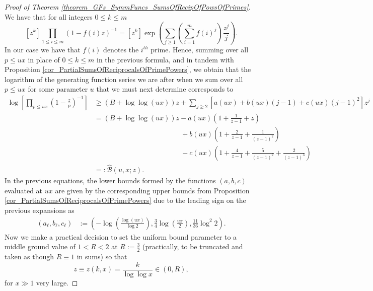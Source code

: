 \documentclass[11pt,reqno,a4letter]{article}
\numberwithin{figure}{section}
\numberwithin{table}{section}
\theoremstyle{plain}
\numberwithin{theorem}{section}
\theoremstyle{definition}
\newcommand{\NBRef}[1]{}
\begin{document}
\NBRef{A06-2020-04-26} 
\begin{proof}[Proof of Theorem \ref{theorem_GFs_SymmFuncs_SumsOfRecipOfPowsOfPrimes}] 
\label{proofOf_theorem_GFs_SymmFuncs_SumsOfRecipOfPowsOfPrimes} 
We have that for all integers $0 \leq k \leq m$
\begin{equation} 
\label{eqn_pf_tag_hSymmPolysGF} 
[z^k] \prod_{1 \leq i \leq m} (1-f(i) z)^{-1} = [z^k] \exp\left(\sum_{j \geq 1} 
     \left(\sum_{i=1}^m f(i)^j\right) \frac{z^j}{j}\right). 
\end{equation} 
In our case we have that $f(i)$ denotes the $i^{th}$ prime. 
Hence, summing over all $p \leq ux$ 
in place of $0 \leq k \leq m$ in the previous formula, and in tandem with 
Proposition \ref{cor_PartialSumsOfReciprocalsOfPrimePowers}, we obtain that the logarithm of the 
generating function series we are after when we sum over all $p \leq ux$ for some parameter 
$u$ that we must next determine corresponds to 
\begin{align*} 
\log\left[\prod_{p \leq ux} \left(1-\frac{z}{p}\right)^{-1}\right] & \geq (B + \log\log (ux)) z + 
     \sum_{j \geq 2} \left[a(ux) + b(ux)(j-1) + c(ux) (j-1)^2\right] z^j \\ 
     & = (B + \log\log (ux)) z - a(ux) \left(1 + \frac{1}{z-1} + z\right) \\ 
     & \phantom{= (B + \log\log (ux)) z\ } + 
     b(ux) \left( 
     1 + \frac{2}{z-1} + \frac{1}{(z-1)^2}\right) \\ 
     & \phantom{= (B + \log\log (ux)) z\ } - 
     c(ux) \left( 
     1 + \frac{4}{z-1} + \frac{5}{(z-1)^2} + \frac{2}{(z-1)^3}\right) \\ 
     & =: \widehat{\mathcal{B}}(u, x; z). 
\end{align*} 
In the previous equations, the lower bounds formed by the functions $(a,b,c)$ 
evaluated at $ux$ are 
given by the corresponding upper bounds from 
Proposition \ref{cor_PartialSumsOfReciprocalsOfPrimePowers} 
due to the leading sign on the previous expansions as 
\begin{align*} 
(a_{\ell}, b_{\ell}, c_{\ell}) & := \left(-\log\left(\frac{\log (ux)}{\log 2}\right), 
     \frac{3}{4} \log\left(\frac{ux}{2}\right), \frac{11}{36} \log^2 2\right). 
\end{align*} 
Now we make a practical decision to set the uniform bound parameter to a middle ground value of 
$1 < R < 2$ at $R := \frac{3}{2}$ 
(practically, to be truncated and taken as though $R \equiv 1$ in sums) so that 
$$z \equiv z(k, x) = \frac{k}{\log\log x} \in (0, R),$$ for $x \gg 1$ very large. 

\end{proof}
\end{document}
